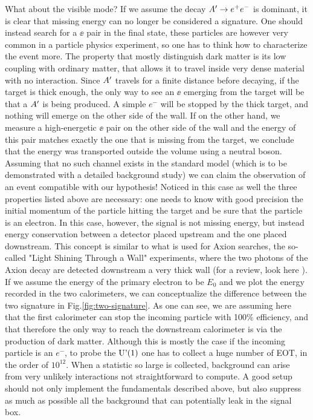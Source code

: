 What about the visible mode? If we assume the decay $A' \to e^+e^-$ is dominant, it is clear that missing energy can no longer be considered a signature. One should instead search for a $\ee$ pair in the final state, these particles are however very common in a particle physics experiment, so one has to think how to characterize the event more. The property that mostly distinguish dark matter is its low coupling with ordinary matter, that allows it to travel inside very dense material with no interaction. Since $A'$ travels for a finite distance before decaying, if the target is thick enough, the only way to see an $\ee$ emerging from the target will be that a $A'$ is being produced. A simple $e^-$ will be stopped by the thick target, and nothing will emerge on the other side of the wall. If on the other hand, we measure a high-energetic $\ee$ pair on the other side of the wall and the energy of this pair matches exactly the one that is missing from the target, we conclude that the energy was transported outside the volume using a neutral boson. Assuming that no such channel exists in the standard model (which is to be demonstrated with a detailed background study) we can claim the observation of an event compatible with our hypothesis! Noticed in this case as well the three properties listed above are necessary: one needs to know with good precision the initial momentum of the particle hitting the target and be sure that the particle is an electron. In this case, however, the signal is not missing energy, but instead energy conservation between a detector placed upstream and the one placed downstream. This concept is similar to what is used for Axion searches, the so-called "Light Shining Through a Wall" experiments, where the two photons of the Axion decay are detected downstream a very thick wall (for a review, look here \cite{Jaeckel:2010ni}).
If we assume the energy of the primary electron to be $E_0$ and we plot the energy recorded in the two calorimeters, we can conceptualize the difference between the two signature in Fig.\ref{fig:two-signature}. As one can see, we are assuming here that the first calorimeter can stop the incoming particle with 100\% efficiency, and that therefore the only way to reach the downstream calorimeter is via the production of dark matter. Although this is mostly the case if the incoming particle is an $e^-$, to probe the $\textrm{U'(1)}$ one has to collect a huge number of EOT, in the order of $10^{12}$. When a statistic so large is collected, background can arise from very unlikely interactions not straightforward to compute. A good setup should not only implement the fundamentals described above, but also suppress as much as possible all the background that can potentially leak in the signal box.

